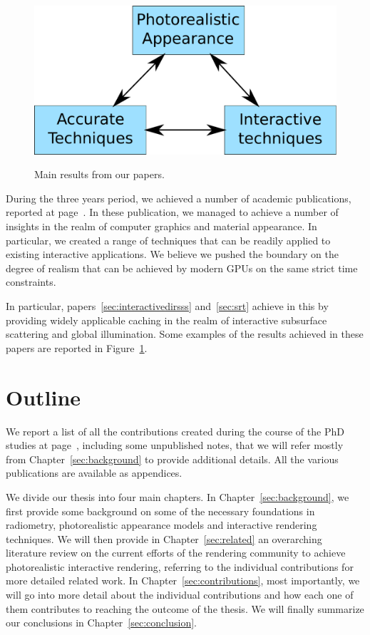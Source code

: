 \begin{figure}
\centering
	 \includegraphics[draft,width=\textwidth]{figures/main_diagram}  \\
\caption{Main results from our papers.} 
\label{fig:main_results}
\end{figure}

During the three years period, we achieved a number of academic publications, reported at page~\pageref{sec:contributionlist}. In these publication, we managed to achieve a number of insights in the realm of computer graphics and material appearance. In particular, we created a range of techniques that can be readily applied to existing interactive applications. We believe we pushed the boundary on the degree of realism that can be achieved by modern GPUs on the same strict time constraints. 

In particular, papers~\ref{sec:interactivedirsss} and~\ref{sec:srt} achieve in this by providing widely applicable caching in the realm of interactive subsurface scattering and global illumination. Some examples of the results achieved in these papers are reported in Figure~\ref{fig:main_results}.

\section{Outline}

We report a list of all the contributions created during the course of the PhD studies at page~\pageref{sec:contributionlist}, including some unpublished notes, that we will refer mostly from Chapter~\ref{sec:background} to provide additional details. All the various publications are available as appendices. 

We divide our thesis into four main chapters. In Chapter~\ref{sec:background}, we first provide some background on some of the necessary foundations in radiometry, photorealistic appearance models and interactive rendering techniques. We will then provide in Chapter~\ref{sec:related} an overarching literature review on the current efforts of the rendering community to achieve photorealistic interactive rendering, referring to the individual contributions for more detailed related work. In Chapter~\ref{sec:contributions}, most importantly, we will go into more detail about the individual contributions and how each one of them contributes to reaching the outcome of the thesis. We will finally summarize our conclusions in Chapter~\ref{sec:conclusion}. 

